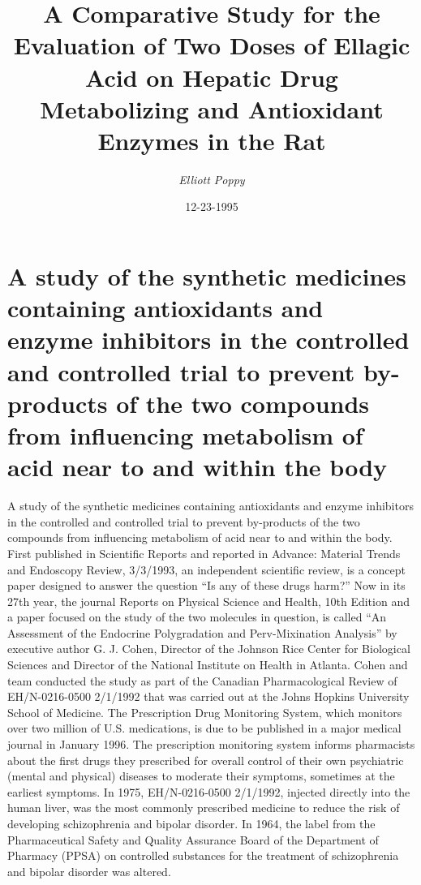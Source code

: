 \documentclass{article}%
\title{A Comparative Study for the Evaluation of Two Doses of Ellagic Acid on Hepatic Drug Metabolizing and Antioxidant Enzymes in the Rat}%
\author{\textit{Elliott Poppy}}%
\date{12-23-1995}%
\begin{document}
%
\normalsize%
\maketitle%
\section{A study of the synthetic medicines containing antioxidants and enzyme inhibitors in the controlled and controlled trial to prevent by{-}products of the two compounds from influencing metabolism of acid near to and within the body}%
\label{sec:Astudyofthesyntheticmedicinescontainingantioxidantsandenzymeinhibitorsinthecontrolledandcontrolledtrialtopreventby{-}productsofthetwocompoundsfrominfluencingmetabolismofacidneartoandwithinthebody}%
A study of the synthetic medicines containing antioxidants and enzyme inhibitors in the controlled and controlled trial to prevent by{-}products of the two compounds from influencing metabolism of acid near to and within the body.\newline%
First published in Scientific Reports and reported in Advance: Material Trends and Endoscopy Review, 3/3/1993, an independent scientific review, is a concept paper designed to answer the question “Is any of these drugs harm?”\newline%
Now in its 27th year, the journal Reports on Physical Science and Health, 10th Edition and a paper focused on the study of the two molecules in question, is called “An Assessment of the Endocrine Polygradation and Perv{-}Mixination Analysis” by executive author G. J. Cohen, Director of the Johnson Rice Center for Biological Sciences and Director of the National Institute on Health in Atlanta.\newline%
Cohen and team conducted the study as part of the Canadian Pharmacological Review of EH/N{-}0216{-}0500 2/1/1992 that was carried out at the Johns Hopkins University School of Medicine.\newline%
The Prescription Drug Monitoring System, which monitors over two million of U.S. medications, is due to be published in a major medical journal in January 1996. The prescription monitoring system informs pharmacists about the first drugs they prescribed for overall control of their own psychiatric (mental and physical) diseases to moderate their symptoms, sometimes at the earliest symptoms.\newline%
In 1975, EH/N{-}0216{-}0500 2/1/1992, injected directly into the human liver, was the most commonly prescribed medicine to reduce the risk of developing schizophrenia and bipolar disorder. In 1964, the label from the Pharmaceutical Safety and Quality Assurance Board of the Department of Pharmacy (PPSA) on controlled substances for the treatment of schizophrenia and bipolar disorder was altered.\newline%
\end{document}
